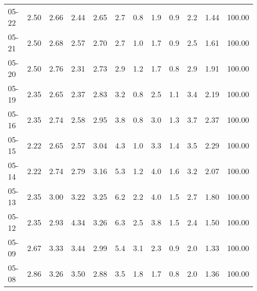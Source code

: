 \begin{threeparttable}
{\begin{tabular}{lrrrrrrrrrrr}
  05-22 &          2.50 &          2.66 &          2.44 &        2.65 &                 2.7 &                 0.8 &        1.9 &                 0.9 &              2.2 &            1.44 &                 100.00 \\
  05-21 &          2.50 &          2.68 &          2.57 &        2.70 &                 2.7 &                 1.0 &        1.7 &                 0.9 &              2.5 &            1.61 &                 100.00 \\
  05-20 &          2.50 &          2.76 &          2.31 &        2.73 &                 2.9 &                 1.2 &        1.7 &                 0.8 &              2.9 &            1.91 &                 100.00 \\
  05-19 &          2.35 &          2.65 &          2.37 &        2.83 &                 3.2 &                 0.8 &        2.5 &                 1.1 &              3.4 &            2.19 &                 100.00 \\
  05-16 &          2.35 &          2.74 &          2.58 &        2.95 &                 3.8 &                 0.8 &        3.0 &                 1.3 &              3.7 &            2.37 &                 100.00 \\
  05-15 &          2.22 &          2.65 &          2.57 &        3.04 &                 4.3 &                 1.0 &        3.3 &                 1.4 &              3.5 &            2.29 &                 100.00 \\
  05-14 &          2.22 &          2.74 &          2.79 &        3.16 &                 5.3 &                 1.2 &        4.0 &                 1.6 &              3.2 &            2.07 &                 100.00 \\
  05-13 &          2.35 &          3.00 &          3.22 &        3.25 &                 6.2 &                 2.2 &        4.0 &                 1.5 &              2.7 &            1.80 &                 100.00 \\
  05-12 &          2.35 &          2.93 &          4.34 &        3.26 &                 6.3 &                 2.5 &        3.8 &                 1.5 &              2.4 &            1.50 &                 100.00 \\
  05-09 &          2.67 &          3.33 &          3.44 &        2.99 &                 5.4 &                 3.1 &        2.3 &                 0.9 &              2.0 &            1.33 &                 100.00 \\
  05-08 &          2.86 &          3.26 &          3.50 &        2.88 &                 3.5 &                 1.8 &        1.7 &                 0.8 &              2.0 &            1.36 &                 100.00 \\

\end{tabular}}
\end{threeparttable}

